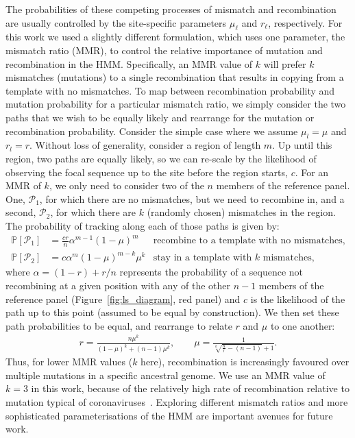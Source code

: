 \documentclass{article}
\begin{document}
The probabilities of these competing processes of mismatch and recombination are
usually controlled by the site-specific parameters $\mu_\ell$ and $r_\ell$,
respectively. For this work we used a slightly different formulation, which
uses one parameter, the mismatch ratio (MMR), to control the relative
importance of mutation and recombination in the HMM. Specifically, an MMR value
of $k$ will prefer $k$ mismatches (mutations) to a single recombination that
 results in copying from a template with no mismatches. To map between
recombination probability and mutation probability for a particular mismatch
ratio, we simply consider the two paths that we wish to be equally likely and
rearrange for the mutation or recombination probability. Consider the simple
case where we assume $\mu_l=\mu$ and $r_l=r$. Without loss of generality,
consider a region of length $m$. Up until this region, two paths are equally
likely, so we can re-scale by the likelihood of observing the focal sequence up
to the site before the region starts, $c$. For an MMR of $k$, we only need to
consider two of the $n$ members of the reference panel.
One, $\mathcal{P}_1$,
for which there are no mismatches, but we need to recombine in, and a second,
$\mathcal{P}_2$, for which there are $k$ (randomly chosen) mismatches in the
region.
The probability of tracking along each of those paths is given by:
\begin{align*}
\mathbb{P}[\mathcal{P}_1] &= \frac{cr}{n}
\alpha^{m-1}\left(1-\mu\right)^m
&\text{recombine to a template with no mismatches,}\\
\mathbb{P}[\mathcal{P}_2] &= c
\alpha^{m}
\left(1-\mu\right)^{m-k}\mu^k &\text{stay in a template with $k$ mismatches,}
\end{align*}
where $\alpha = (1 - r) + r/n$ represents the probability of a sequence not recombining at a
given position with any of the other $n-1$ members of the reference panel
(Figure~\ref{fig:ls_diagram}, red panel) and $c$ is the
likelihood of the path up to this point (assumed to be
equal by construction).
We then
set these path probabilities to be equal, and rearrange to relate $r$ and $\mu$ to one another:
\begin{align*} r = \frac{n\mu^k}{\left(1-\mu\right)^k + \left(n-1\right)\mu^k},
\quad\quad \mu = \frac{1}{\sqrt[k]{\frac{n}{r} - (n-1)} + 1}. \end{align*}
Thus, for lower MMR values ($k$ here),
recombination is increasingly favoured over multiple mutations in a specific ancestral genome.
We use an MMR value of $k=3$ in this work,
because of the relatively high rate of recombination relative
to mutation typical of
coronaviruses~\citep{amoutzias2022remarkable}.
Exploring different mismatch ratios and more sophisticated parameterisations
of the HMM are important avenues for future work.
\end{document}
